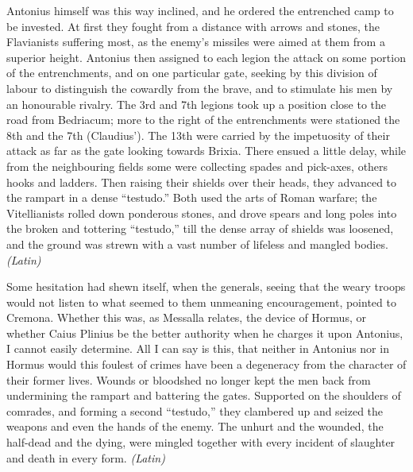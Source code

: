 
Antonius himself was this way inclined, and he ordered the entrenched camp to be invested. At first they fought from a distance with arrows and stones, the Flavianists suffering most, as the enemy's missiles were aimed at them from a superior height. Antonius then assigned to each legion the attack on some portion of the entrenchments, and on one particular gate, seeking by this division of labour to distinguish the cowardly from the brave, and to stimulate his men by an honourable rivalry. The 3rd and 7th legions took up a position close to the road from Bedriacum; more to the right of the entrenchments were stationed the 8th and the 7th (Claudius'). The 13th were carried by the impetuosity of their attack as far as the gate looking towards Brixia. There ensued a little delay, while from the neighbouring fields some were collecting spades and pick-axes, others hooks and ladders. Then raising their shields over their heads, they advanced to the rampart in a dense ``testudo.'' Both used the arts of Roman warfare; the Vitellianists rolled down ponderous stones, and drove spears and long poles into the broken and tottering ``testudo,'' till the dense array of shields was loosened, and the ground was strewn with a vast number of lifeless and mangled bodies. \emph{(Latin)}


Some hesitation had shewn itself, when the generals, seeing that the weary troops would not listen to what seemed to them unmeaning encouragement, pointed to Cremona. Whether this was, as Messalla relates, the device of Hormus, or whether Caius Plinius be the better authority when he charges it upon Antonius, I cannot easily determine. All I can say is this, that neither in Antonius nor in Hormus would this foulest of crimes have been a degeneracy from the character of their former lives. Wounds or bloodshed no longer kept the men back from undermining the rampart and battering the gates. Supported on the shoulders of comrades, and forming a second ``testudo,'' they clambered up and seized the weapons and even the hands of the enemy. The unhurt and the wounded, the half-dead and the dying, were mingled together with every incident of slaughter and death in every form. \emph{(Latin)}


